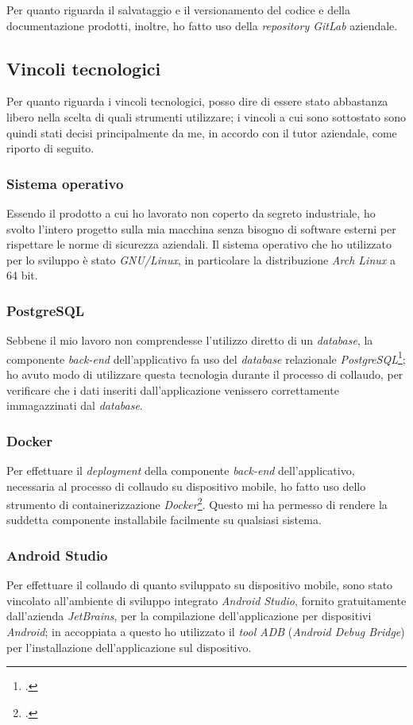 Per quanto riguarda il salvataggio e il versionamento del codice e della documentazione prodotti, inoltre, ho fatto uso della \textit{repository GitLab} aziendale.

\subsection{Vincoli tecnologici}

Per quanto riguarda i vincoli tecnologici, posso dire di essere stato abbastanza libero nella scelta di quali strumenti utilizzare; i vincoli a cui sono sottostato sono quindi stati decisi principalmente da me, in accordo con il tutor aziendale, come riporto di seguito.

\subsubsection*{Sistema operativo}

Essendo il prodotto a cui ho lavorato non coperto da segreto industriale, ho svolto l'intero progetto sulla mia macchina senza bisogno di software esterni per rispettare le norme di sicurezza aziendali. Il sistema operativo che ho utilizzato per lo sviluppo è stato \textit{GNU/Linux}, in particolare la distribuzione \textit{Arch Linux} a 64 bit.

\subsubsection*{PostgreSQL}
Sebbene il mio lavoro non comprendesse l'utilizzo diretto di un \textit{database}, la componente \textit{back-end} dell'applicativo fa uso del \textit{database} relazionale \textit{PostgreSQL}\footcite{tec:postgres}; ho avuto modo di utilizzare questa tecnologia durante il processo di collaudo, per verificare che i dati inseriti dall'applicazione venissero correttamente immagazzinati dal \textit{database}.

\subsubsection*{Docker}
Per effettuare il \textit{deployment} della componente \textit{back-end} dell'applicativo, necessaria al processo di collaudo su dispositivo mobile, ho fatto uso dello strumento di containerizzazione \textit{Docker}\footcite{tec:docker}. Questo mi ha permesso di rendere la suddetta componente installabile facilmente su qualsiasi sistema.

\subsubsection*{Android Studio}
Per effettuare il collaudo di quanto sviluppato su dispositivo mobile, sono stato vincolato all'ambiente di sviluppo integrato \textit{Android Studio}, fornito gratuitamente dall'azienda \textit{JetBrains}, per la compilazione dell'applicazione per dispositivi \textit{Android}; in accoppiata a questo ho utilizzato il \textit{tool ADB} (\textit{Android Debug Bridge}) per l'installazione dell'applicazione sul dispositivo.

